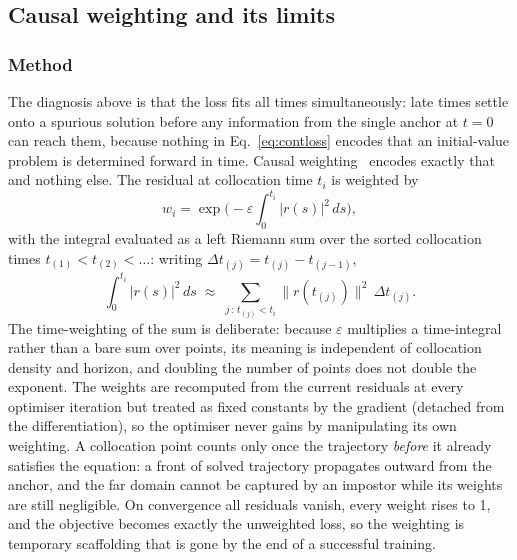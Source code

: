 \documentclass[11pt,a4paper]{article}
\begin{document}
\subsection{Causal weighting and its limits}
\label{sec:causal}

\subsubsection{Method}

The diagnosis above is that the loss fits all times simultaneously: late
times settle onto a spurious solution before any information from the
single anchor at $t = 0$ can reach them, because nothing in
Eq.~\eqref{eq:contloss} encodes that an initial-value problem is determined
forward in time. Causal weighting~\cite{wang2024causal} encodes exactly
that and nothing else. The residual at collocation time $t_i$ is weighted
by
\begin{equation}
  w_i = \exp\!\Big(-\varepsilon \int_0^{t_i} |r(s)|^2 \, ds\Big),
  \label{eq:causal}
\end{equation}
with the integral evaluated as a left Riemann sum over the sorted
collocation times $t_{(1)} < t_{(2)} < \dots$: writing
$\Delta t_{(j)} = t_{(j)} - t_{(j-1)}$,
\begin{equation*}
  \int_0^{t_i} |r(s)|^2 \, ds \;\approx\;
  \sum_{j\,:\,t_{(j)} < t_i} \big\lVert r(t_{(j)}) \big\rVert^2\,
  \Delta t_{(j)} .
\end{equation*}
The time-weighting of the sum is deliberate: because $\varepsilon$
multiplies a time-integral rather than a bare sum over points, its
meaning is independent of collocation density and horizon, and doubling
the number of points does not double the exponent. The weights are
recomputed from the current residuals at every optimiser iteration but
treated as fixed constants by the gradient (detached from the
differentiation), so the optimiser never gains by manipulating its own
weighting. A collocation
point counts only once the trajectory \emph{before} it already satisfies
the equation: a front of solved trajectory propagates outward from the
anchor, and the far domain cannot be captured by an impostor while its
weights are still negligible. On convergence all residuals vanish, every
weight rises to 1, and the objective becomes exactly the unweighted loss,
so the weighting is temporary scaffolding that is gone by the end of a
successful training.
\end{document}
